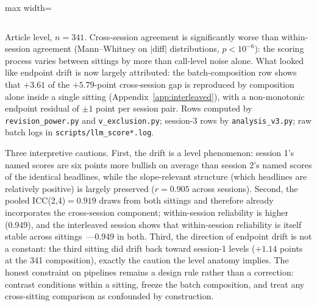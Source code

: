 \begin{table}[htbp]
\begin{adjustbox}{max width=\textwidth}
\begin{tabular}{lc}
\end{tabular}
\end{adjustbox}
\begin{tablenotes}[flushleft]\footnotesize
\item Article level, $n=341$. Cross-session agreement is significantly worse than within-session agreement (Mann--Whitney on $|$diff$|$ distributions, $p<10^{-6}$): the scoring process varies between sittings by more than call-level noise alone. What looked like endpoint drift is now largely attributed: the batch-composition row shows that $+3.61$ of the $+5.79$-point cross-session gap is reproduced by composition alone inside a single sitting (Appendix~\ref{app:interleaved}), with a non-monotonic endpoint residual of $\pm1$ point per session pair. Rows computed by \texttt{revision\_power.py} and \texttt{v\_exclusion.py}; session-3 rows by \texttt{analysis\_v3.py}; raw batch logs in \texttt{scripts/llm\_score*.log}.
\end{tablenotes}
\end{table}

Three interpretive cautions. First, the drift is a level phenomenon: session 1's named scores are six points more bullish on average than session 2's named scores of the identical headlines, while the slope-relevant structure (which headlines are relatively positive) is largely preserved ($r=0.905$ across sessions). Second, the pooled ICC(2,4)$=0.919$ draws from both sittings and therefore already incorporates the cross-session component; within-session reliability is higher (0.949), and the interleaved session shows that within-session reliability is itself stable across sittings~---0.949 in both. Third, the direction of endpoint drift is not a constant: the third sitting did drift back toward session-1 levels ($+1.14$ points at the 341 composition), exactly the caution the level anatomy implies. The honest constraint on pipelines remains a design rule rather than a correction: contrast conditions within a sitting, freeze the batch composition, and treat any cross-sitting comparison as confounded by construction.

